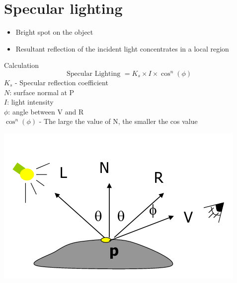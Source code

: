 \documentclass{article}[18pt]
\begin{document}
\section{Specular lighting}
\begin{itemize}
	\item Bright spot on the object
	\item Resultant reflection of the incident light concentrates in a local region
\end{itemize}
Calculation
$$\text{Specular Lighting } = K_s\times I \times \cos^n(\phi)$$
$K_s$ - Specular reflection coefficient\\
$N$: surface normal at P\\
$I$: light intensity\\
$\phi$: angle between V and R\\
$\cos^n(\phi)$ - The large the value of N, the smaller the cos value
\begin{center}
	\includegraphics[scale=0.7]{Specular_Lighting}
\end{center}
\end{document}

